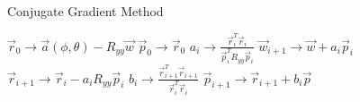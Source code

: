   
  
     
  \begin{algorithm}
    \caption{Conjugate Gradient Method}
      \label{alg:cg}
      \begin{algorithmic}
        \STATE $\vec{r}_0 \rightarrow \vec{a}(\phi,\theta) - R_{yy}\vec{w}$
        \STATE $\vec{p}_0 \rightarrow \vec{r}_0$
          \STATE $a_i \rightarrow \frac{\vec{r}_i^T \vec{r}_i}{\vec{p}_i^T R_{yy}\vec{p}_i}$
          \STATE $\vec{w}_{i+1} \rightarrow \vec{w} + a_i \vec{p}_i$
          \STATE $\vec{r}_{i+1} \rightarrow \vec{r}_i - a_i R_{yy}\vec{p}_i$
          \STATE $b_i \rightarrow \frac{\vec{r}_{i+1}^T\vec{r}_{i+1}}{\vec{r}_i^T\vec{r}_i}$
          \STATE $\vec{p}_{i+1} \rightarrow \vec{r}_{i+1} + b_i \vec{p}$
        \ENDWHILE
      \end{algorithmic}
    \end{algorithm}
  
  
